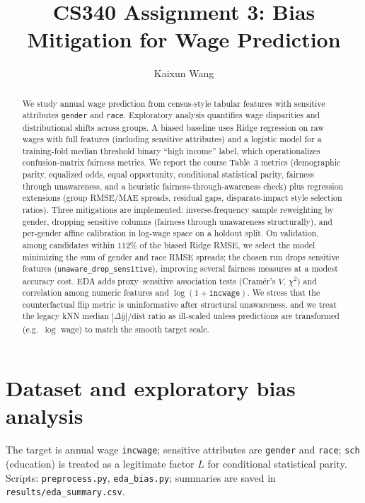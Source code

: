 \documentclass[sigconf,nonacm]{acmart}
\title{CS340 Assignment 3: Bias Mitigation for Wage Prediction}
\author{Kaixun Wang}
\affiliation{
  \institution{Southern University of Science and Technology}
  \city{Shenzhen}
  \country{China}
}
\begin{document}
\begin{abstract}
We study annual wage prediction from census-style tabular features with sensitive attributes \texttt{gender} and \texttt{race}.
Exploratory analysis quantifies wage disparities and distributional shifts across groups.
A biased baseline uses Ridge regression on raw wages with full features (including sensitive attributes) and a logistic model for a training-fold median threshold binary ``high income'' label, which operationalizes confusion-matrix fairness metrics.
We report the course Table~3 metrics (demographic parity, equalized odds, equal opportunity, conditional statistical parity, fairness through unawareness, and a heuristic fairness-through-awareness check) plus regression extensions (group RMSE/MAE spreads, residual gaps, disparate-impact style selection ratios).
Three mitigations are implemented: inverse-frequency sample reweighting by gender, dropping sensitive columns (fairness through unawareness structurally), and per-gender affine calibration in log-wage space on a holdout split.
On validation, among candidates within $112\%$ of the biased Ridge RMSE, we select the model minimizing the sum of gender and race RMSE spreads; the chosen run drops sensitive features (\texttt{unaware\_drop\_sensitive}), improving several fairness measures at a modest accuracy cost.
EDA adds proxy--sensitive association tests (Cram\'er's $V$, $\chi^2$) and correlation among numeric features and $\log(1{+}\texttt{incwage})$.
We stress that the counterfactual flip metric is uninformative after structural unawareness, and we treat the legacy kNN median $|\Delta\hat y|/\mathrm{dist}$ ratio as ill-scaled unless predictions are transformed (e.g.\ $\log$ wage) to match the smooth target scale.
\end{abstract}


\maketitle

\section{Dataset and exploratory bias analysis}

The target is annual wage \texttt{incwage}; sensitive attributes are \texttt{gender} and \texttt{race}; \texttt{sch} (education) is treated as a legitimate factor $L$ for conditional statistical parity.
Scripts: \texttt{preprocess.py}, \texttt{eda\_bias.py}; summaries are saved in \texttt{results/eda\_summary.csv}.
\end{document}
